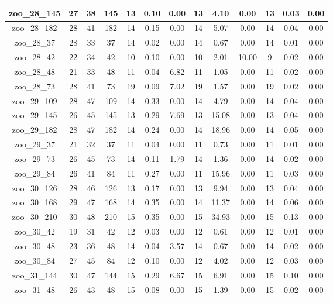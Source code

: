 \begin{landscape}
\begin{longtable}{|c|c|c|c|c|c|c|c|c|c|c|c|c|}
zoo\_28\_145 & 27 & 38 & 145 & 13 & 0.10 & 0.00 & 13 & 4.10 & 0.00 & 13 & 0.03 & 0.00 \\ \hline 
zoo\_28\_182 & 28 & 41 & 182 & 14 & 0.15 & 0.00 & 14 & 5.07 & 0.00 & 14 & 0.04 & 0.00 \\ \hline 
zoo\_28\_37 & 28 & 33 & 37 & 14 & 0.02 & 0.00 & 14 & 0.67 & 0.00 & 14 & 0.01 & 0.00 \\ \hline 
zoo\_28\_42 & 22 & 34 & 42 & 10 & 0.10 & 0.00 & 10 & 2.01 & 10.00 & 9 & 0.02 & 0.00 \\ \hline 
zoo\_28\_48 & 21 & 33 & 48 & 11 & 0.04 & 6.82 & 11 & 1.05 & 0.00 & 11 & 0.02 & 0.00 \\ \hline 
zoo\_28\_73 & 28 & 41 & 73 & 19 & 0.09 & 7.02 & 19 & 1.57 & 0.00 & 19 & 0.02 & 0.00 \\ \hline 
zoo\_29\_109 & 28 & 47 & 109 & 14 & 0.33 & 0.00 & 14 & 4.79 & 0.00 & 14 & 0.04 & 0.00 \\ \hline 
zoo\_29\_145 & 26 & 45 & 145 & 13 & 0.29 & 7.69 & 13 & 15.08 & 0.00 & 13 & 0.04 & 0.00 \\ \hline 
zoo\_29\_182 & 28 & 47 & 182 & 14 & 0.24 & 0.00 & 14 & 18.96 & 0.00 & 14 & 0.05 & 0.00 \\ \hline 
zoo\_29\_37 & 21 & 32 & 37 & 11 & 0.04 & 0.00 & 11 & 0.73 & 0.00 & 11 & 0.01 & 0.00 \\ \hline 
zoo\_29\_73 & 26 & 45 & 73 & 14 & 0.11 & 1.79 & 14 & 1.36 & 0.00 & 14 & 0.02 & 0.00 \\ \hline 
zoo\_29\_84 & 26 & 41 & 84 & 11 & 0.27 & 0.00 & 11 & 15.96 & 0.00 & 11 & 0.03 & 0.00 \\ \hline 
zoo\_30\_126 & 28 & 46 & 126 & 13 & 0.17 & 0.00 & 13 & 9.94 & 0.00 & 13 & 0.04 & 0.00 \\ \hline 
zoo\_30\_168 & 29 & 47 & 168 & 14 & 0.35 & 0.00 & 14 & 11.37 & 0.00 & 14 & 0.06 & 0.00 \\ \hline 
zoo\_30\_210 & 30 & 48 & 210 & 15 & 0.35 & 0.00 & 15 & 34.93 & 0.00 & 15 & 0.13 & 0.00 \\ \hline 
zoo\_30\_42 & 19 & 31 & 42 & 12 & 0.03 & 0.00 & 12 & 0.61 & 0.00 & 12 & 0.01 & 0.00 \\ \hline 
zoo\_30\_48 & 23 & 36 & 48 & 14 & 0.04 & 3.57 & 14 & 0.67 & 0.00 & 14 & 0.02 & 0.00 \\ \hline 
zoo\_30\_84 & 27 & 45 & 84 & 12 & 0.10 & 0.00 & 12 & 4.02 & 0.00 & 12 & 0.03 & 0.00 \\ \hline 
zoo\_31\_144 & 30 & 47 & 144 & 15 & 0.29 & 6.67 & 15 & 6.91 & 0.00 & 15 & 0.10 & 0.00 \\ \hline 
zoo\_31\_48 & 26 & 43 & 48 & 15 & 0.08 & 0.00 & 15 & 1.39 & 0.00 & 15 & 0.02 & 0.00 \\ \hline 

\end{longtable}
\end{landscape}
